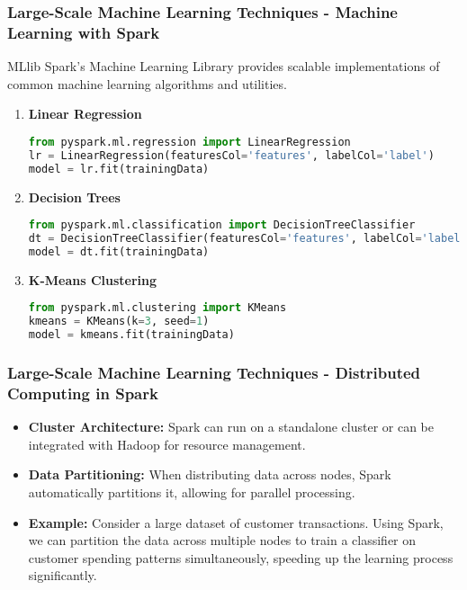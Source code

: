 \documentclass[aspectratio=169]{beamer}
\begin{document}
\begin{frame}[fragile]
    \frametitle{Large-Scale Machine Learning Techniques - Machine Learning with Spark}
    \begin{block}{MLlib}
        Spark’s Machine Learning Library provides scalable implementations of common machine learning algorithms and utilities.
    \end{block}
    \begin{enumerate}
        \item \textbf{Linear Regression}
        \begin{lstlisting}[language=Python]
from pyspark.ml.regression import LinearRegression
lr = LinearRegression(featuresCol='features', labelCol='label')
model = lr.fit(trainingData)
        \end{lstlisting}
        
        \item \textbf{Decision Trees}
        \begin{lstlisting}[language=Python]
from pyspark.ml.classification import DecisionTreeClassifier
dt = DecisionTreeClassifier(featuresCol='features', labelCol='label')
model = dt.fit(trainingData)
        \end{lstlisting}

        \item \textbf{K-Means Clustering}
        \begin{lstlisting}[language=Python]
from pyspark.ml.clustering import KMeans
kmeans = KMeans(k=3, seed=1)
model = kmeans.fit(trainingData)
        \end{lstlisting}
    \end{enumerate}
\end{frame}

\begin{frame}[fragile]
    \frametitle{Large-Scale Machine Learning Techniques - Distributed Computing in Spark}
    \begin{itemize}
        \item \textbf{Cluster Architecture:} 
        Spark can run on a standalone cluster or can be integrated with Hadoop for resource management.
        
        \item \textbf{Data Partitioning:} 
        When distributing data across nodes, Spark automatically partitions it, allowing for parallel processing.

        \item \textbf{Example:} 
        Consider a large dataset of customer transactions. Using Spark, we can partition the data across multiple nodes to train a classifier on customer spending patterns simultaneously, speeding up the learning process significantly.
    \end{itemize}
\end{frame}
\end{document}
